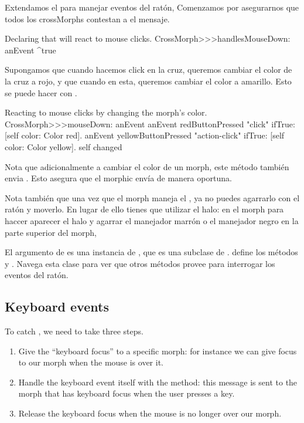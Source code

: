 \documentclass[a4paper,10pt,twoside]{book}
\begin{document}
Extendamos el  para manejar eventos del rat\'on, 
Comenzamos por asegurarnos que todos los crossMorphs contestan  a el mensaje. 

\begin{method}{Declaring that  will react to mouse clicks.}
CrossMorph>>>handlesMouseDown: anEvent
	^true
\end{method}

Supongamos que cuando hacemos click en la cruz, queremos cambiar el color de la cruz a rojo, y que cuando \actclick en esta, queremos cambiar el color a amarillo.
Esto se puede hacer con .

\begin{method}[mouseDown]{Reacting to mouse clicks by changing the morph's color.}
CrossMorph>>>mouseDown: anEvent
	anEvent redButtonPressed "click"
		ifTrue: [self color: Color red].
	anEvent yellowButtonPressed "action-click"
		ifTrue: [self color: Color yellow].
	self changed
\end{method}

Nota que adicionalmente a cambiar el color de un morph, este m\'etodo tambi\'en envia .
Esto asegura que el morphic env\'ia  de manera oportuna.

Nota tambi\'en que una vez que el morph maneja el , ya no puedes agarrarlo con el rat\'on y moverlo.
En lugar de ello tienes que utilizar el halo: \metaclick en el morph para haccer aparecer el halo y agarrar el manejador marr\'on \moveHandle{}  o el manejador negro \grabHandle{} en la parte superior del morph,

El argumento  de  es una instancia de \mbox{,} que es una subclase de  .  define los m\'etodos  y . Navega esta clase para ver que otros m\'etodos provee para interrogar los eventos del rat\'on.

\subsection{Keyboard events}

To catch , we need to take three steps.
\begin{enumerate}
	\item Give the ``keyboard focus'' to a specific morph: for instance we can give focus to our morph when the mouse is over it.
	\item Handle the keyboard event itself with the  method: this message is sent to the morph that has keyboard focus when the user presses a key.
	\item Release the keyboard focus when the mouse is no longer over our morph.
\end{enumerate}
\end{document}
